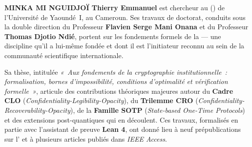 \begin{tcolorbox}[
    enhanced,
    breakable,
    colback=white,
    colframe=CouleurSecondaire,
    arc=4pt,
    boxrule=1pt,
    left=10pt, right=10pt, top=10pt, bottom=10pt
]

\textbf{MINKA MI NGUIDJOÏ Thierry Emmanuel} est chercheur au  () de l'Université de Yaoundé~I, au Cameroun. Ses travaux de doctorat, conduits sous la double direction du Professeur \textbf{Flavien Serge Mani Onana} et du Professeur \textbf{Thomas Djotio Ndié}, portent sur les fondements formels de la  — une discipline qu'il a lui-même fondée et dont il est l'initiateur reconnu au sein de la communauté scientifique internationale.

\medskip

Sa thèse, intitulée \textit{«~Aux fondements de la cryptographie institutionnelle~: formalisation, bornes d'impossibilité, conditions d'optimalité et vérification formelle~»}, articule des contributions théoriques majeures autour du \textbf{Cadre CLO} (\textit{Confidentiality-Legibility-Opacity}), du \textbf{Trilemme CRO} (\textit{Confidentiality-Recoverability-Opacity}), de la \textbf{Famille SOTP} (\textit{State-based One-Time Protocols}) et des extensions post-quantiques qui en découlent. Ces travaux, formalisés en partie avec l'assistant de preuve \textbf{Lean 4}, ont donné lieu à neuf prépublications sur l' et à plusieurs articles publiés dans \textit{IEEE Access}.

\end{tcolorbox}

\vspace{1ex}


